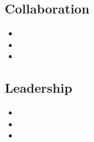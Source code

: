 \documentclass{article}
\begin{document}
    \subsection{Collaboration}
      \begin{itemize}
        \item 
        \item 
        \item 
      \end{itemize}
    \subsection{Leadership}
      \begin{itemize}
        \item 
        \item 
        \item 
      \end{itemize}
    
\end{document}
